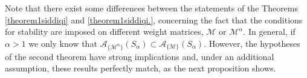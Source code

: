 \documentclass[11pt,a4paper]{article}
\theoremstyle{plain}
\newtheorem{proposition}{Proposition}[section]
\theoremstyle{definition}
\newcommand{\red}[1]{{\color{red}#1}}
\newcommand{\M}{\mathbb{M}}
\newcommand{\LL}{\mathbb{L}}
\newcommand{\G}{\mathbb{G}}
\let\on=\operatorname
\begin{document}
Note that there exist some differences between the statements of the Theorems \ref{theorem1siddiqi} and \ref{theorem1siddiqi.}, concerning the fact that the conditions for stability are imposed on different weight matrices, $\mathcal{M}$ or $\mathcal{M^\alpha}$. In general, if $\alpha>1$ we only know that $\mathcal{A}_{\{\mathcal{M^\alpha}\}}(S_{\alpha})\subset \mathcal{A}_{\{\mathcal{M}\}}(S_{\alpha})$. However, {the hypotheses of the second theorem have strong implications and, under an additional assumption, these results perfectly match, as the next proposition shows.}\\
%
%
\end{document}
